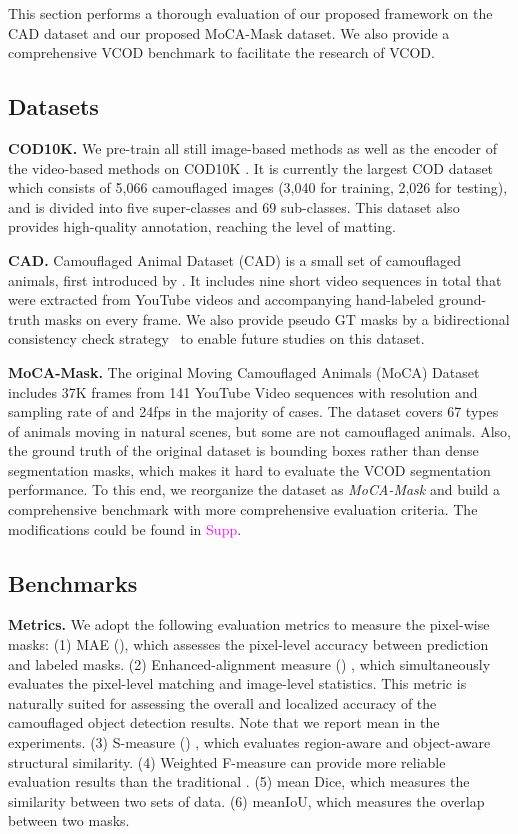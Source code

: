 \documentclass[10pt,twocolumn,letterpaper]{article}
\newcommand{\supp}[1]{\textcolor{magenta}{#1}}
\begin{document}
This section performs a thorough evaluation of our proposed framework on the CAD dataset and our proposed MoCA-Mask dataset. We also provide a comprehensive VCOD benchmark to facilitate the research of VCOD.

\subsection{Datasets}
\vspace{-5pt}
\textbf{COD10K.} We pre-train all still image-based methods as well as the encoder of the video-based methods on COD10K \cite{fan2021concealed}. It is currently the largest COD dataset which consists of 5,066 camouflaged images (3,040 for training, 2,026 for testing), and is divided into five super-classes and 69 sub-classes. This dataset also provides high-quality annotation, reaching the level of matting. 

\textbf{CAD.} Camouflaged Animal Dataset (CAD) is a small set of camouflaged animals, first introduced by \cite{bideau2016s}. It includes nine short video sequences in total that were extracted from YouTube videos and accompanying hand-labeled ground-truth masks on every  frame. We also provide pseudo GT masks by a bidirectional consistency check strategy~\cite{teed2020raft} 
to enable future studies on this dataset.



\textbf{MoCA-Mask.}
The original Moving Camouflaged Animals (MoCA) Dataset \cite{lamdouar2020betrayed} includes 37K frames from 141 YouTube Video sequences with resolution and sampling rate of  and 24fps in the majority of cases. The dataset covers 67 types of animals moving in natural scenes, but some are not camouflaged animals. Also, the ground truth of the original dataset is bounding boxes rather than dense segmentation masks, which makes it hard to evaluate the VCOD segmentation performance. To this end, we reorganize the dataset as \textit{MoCA-Mask} and build a comprehensive benchmark with more comprehensive evaluation criteria. 
The modifications could be found in \supp{Supp}.




\subsection{Benchmarks}
\textbf{Metrics.}  
We adopt the following evaluation metrics to measure the pixel-wise masks: (1) MAE (), which assesses the pixel-level accuracy between prediction and labeled masks. (2) Enhanced-alignment measure () \cite{Fan2018Enhanced}, which simultaneously evaluates the pixel-level matching and image-level statistics. This metric is naturally suited for assessing the overall and localized accuracy of the camouflaged object detection results. Note that we report mean  in the experiments. (3) S-measure () \cite{fan2017structure}, which evaluates region-aware and object-aware structural similarity. (4) Weighted F-measure  \cite{margolin2014evaluate} can provide more reliable evaluation results than the traditional . (5) mean Dice, which measures the similarity between two sets of data. (6) meanIoU, which measures the overlap between two masks.
\end{document}
